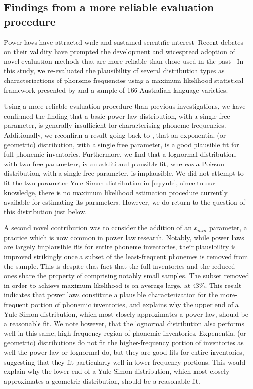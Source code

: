 \hypertarget{findings-from-a-more-reliable-evaluation-procedure}{%
\subsection{Findings from a more reliable evaluation procedure}\label{findings-from-a-more-reliable-evaluation-procedure}}

Power laws have attracted wide and sustained scientific interest. Recent debates on their validity have prompted the development and widespread adoption of novel evaluation methods that are more reliable than those used in the past \autocites{clauset_power-law_2009}{stumpf_critical_2012}. In this study, we re-evaluated the plausibility of several distribution types as characterizations of phoneme frequencies using a maximum likelihood statistical framework presented by \textcite{clauset_power-law_2009} and a sample of 166 Australian language varieties.

Using a more reliable evaluation procedure than previous investigations, we have confirmed the finding that a basic power law distribution, with a single free parameter, is generally insufficient for characterising phoneme frequencies. Additionally, we reconfirm a result going back to \textcite{sigurd_rank-frequency_1968}, that an exponential (or geometric) distribution, with a single free parameter, is a good plausible fit for full phonemic inventories. Furthermore, we find that a lognormal distribution, with two free parameters, is an additional plausible fit, whereas a Poisson distribution, with a single free parameter, is implausible. We did not attempt to fit the two-parameter Yule-Simon distribution in \eqref{eq:yule}, since to our knowledge, there is no maximum likelihood estimation procedure currently available for estimating its parameters. However, we do return to the question of this distribution just below.

A second novel contribution was to consider the addition of an \(x_{min}\) parameter, a practice which is now common in power law research. Notably, while power laws are largely implausible fits for entire phoneme inventories, their plausibility is improved strikingly once a subset of the least-frequent phonemes is removed from the sample. This is despite that fact that the full inventories and the reduced ones share the property of comprising notably small samples. The subset removed in order to achieve maximum likelihood is on average large, at 43\%. This result indicates that power laws constitute a plausible characterization for the more-frequent portion of phonemic inventories, and explains why the upper end of a Yule-Simon distribution, which most closely approximates a power law, should be a reasonable fit. We note however, that the lognormal distribution also performs well in this same, high frequency region of phonemic inventories. Exponential (or geometric) distributions do not fit the higher-frequency portion of inventories as well the power law or lognormal do, but they are good fits for entire inventories, suggesting that they fit particularly well in lower-frequency portions. This would explain why the lower end of a Yule-Simon distribution, which most closely approximates a geometric distribution, should be a reasonable fit.

